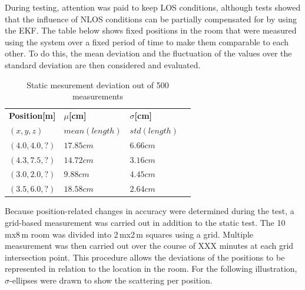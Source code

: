 \documentclass[conference, a4paper]{IEEEtran}
\begin{document}
During testing, attention was paid to keep \ac{LOS} conditions,
although tests showed that the influence of \ac{NLOS} conditions can be partially compensated for by using the \ac{EKF}.
The table below shows fixed positions in the room that were measured using the system
over a fixed period of time to make them comparable to each other.
To do this, the mean deviation and the fluctuation of the values over the standard deviation are then considered and evaluated.

\begin{table}[hbt!]
	\centering
	\begin{tabular}{l l l c}
		\textbf{Position[m]} & \textbf{$\mu$[cm]} & \textbf{$\sigma$[cm]}\\
		$(x,y,z)$ & $mean(length)$ & $std(length)$\\
		$(4.0,4.0,?)$ & $17.85cm$ & $6.66cm$\\
		$(4.3,7.5,?)$ & $14.72cm$ & $3.16cm$\\
		$(3.0,2.0,?)$ & $9.88cm$ & $4.45cm$\\
		$(3.5,6.0,?)$ & $18.58cm$ & $2.64cm$\\
	\end{tabular}
	\caption{Static mesurement deviation out of 500 measurements}
\end{table}

Because position-related changes in accuracy were determined during the test,
a grid-based measurement was carried out in addition to the static test.
The 10\,mx8\,m room was divided into 2\,mx2\,m squares using a grid.
Multiple measurement was then carried out over the course of XXX minutes at each grid intersection point.
This procedure allows the deviations of the positions to be represented in relation to the location in the room.
For the following illustration, $\sigma$-ellipses were drawn to show the scattering per position.
\end{document}
